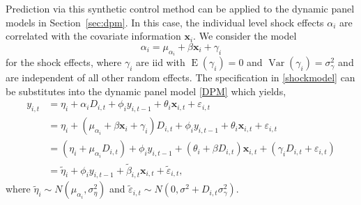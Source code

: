 \documentclass[11pt]{article}
\newcommand{\x}{\textbf{x}}
\DeclareMathOperator{\E}{E}
\DeclareMathOperator{\Var}{Var}
\begin{document}
Prediction via this synthetic control method can be applied to the dynamic 
panel models in Section~\ref{sec:dpm}.  In this case, the individual level 
shock effects $\alpha_i$ are correlated with the covariate information 
$\x_i$.  We consider the model 
\begin{equation} \label{shockmodel}
  \alpha_{i} = \mu_{\alpha_i} + \beta\x_i + \gamma_{i}
\end{equation}
for the shock effects, where $\gamma_{i}$ are iid with 
$\E(\gamma_i) = 0$ and $\Var(\gamma_i) = \sigma^2_\gamma$ and are 
independent of all other random effects.  
The specification in \eqref{shockmodel} can be substitutes into the dynamic 
panel model \eqref{DPM} which yields,
\begin{align*} 
  y_{i,t} &= \eta_i + \alpha_iD_{i,t} + \phi_i y_{i,t-1} + \theta_i \x_{i,t} 
    + \varepsilon_{i,t} \\
  &= \eta_i + (\mu_{\alpha_i} + \beta\x_i + \gamma_{i})D_{i,t} 
    + \phi_i y_{i,t-1} + \theta_i \x_{i,t} + \varepsilon_{i,t} \\
  &= (\eta_i + \mu_{\alpha_i}D_{i,t}) + \phi_i y_{i,t-1} 
    + (\theta_i + \beta D_{i,t})\x_{i,t} + (\gamma_{i}D_{i,t} 
    + \varepsilon_{i,t}) \\
  &= \tilde\eta_i + \phi_i y_{i,t-1} + \tilde\beta_{i,t}\x_{i,t} + \tilde\varepsilon_{i,t},
\end{align*}
where $\tilde\eta_i \sim N(\mu_{\alpha_i},\sigma^2_\eta)$ 
and $\tilde\varepsilon_{i,t} \sim N(0, \sigma^2 + D_{i,t}\sigma^2_\gamma)$.
\end{document}
